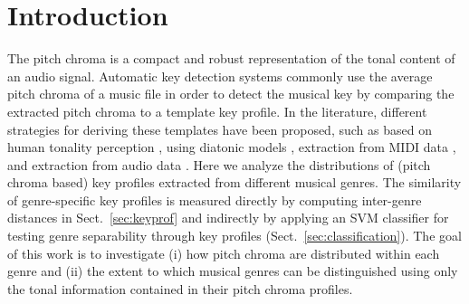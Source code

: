 \documentclass{article}
\title{\papertitle}
\begin{document}
%
\capstartfalse
\maketitle
\capstarttrue
%
\begin{abstract}
The most common approaches to the automatic recognition
of musical key are template-based, i.e., an extracted pitch
chroma vector is compared to a template key profile in order
to identify the most similar key. General as well as domain-specific templates have been used in the past, but to the authors’ best knowledge there has been no study that evaluated
genre-specific key profiles extracted from the audio signal. We
investigate the pitch chroma distributions for 9 different genres, their distances, and the degree to which these genres can
be identified using these distributions when utilizing different
strategies for achieving key-invariance.
\end{abstract}
%

\section{Introduction}\label{sec:introduction}
The pitch chroma is a compact and robust representation of
the tonal content of an audio signal. Automatic key detection
systems commonly use the average pitch chroma of a music
file in order to detect the musical key by comparing the extracted pitch chroma to a template key profile. In the literature,
different strategies for deriving these templates have been proposed, such as based on human tonality perception \cite{krumhansl_cognitive_1990}, using
diatonic models \cite{izmirli_template_2005}, extraction from MIDI data \cite{temperley_pitch-class_2008}, and extraction from audio data \cite{van_de_par_musical_2006}. Here we analyze the distributions
of (pitch chroma based) key profiles extracted from different
musical genres. The similarity of genre-specific key profiles
is measured directly by computing inter-genre distances in
Sect.~\ref{sec:keyprof} and indirectly by applying an SVM classifier for testing genre separability through key profiles (Sect.~\ref{sec:classification}). The goal
of this work is to investigate (i) how pitch chroma are distributed within each genre and (ii) the extent to which musical
genres can be distinguished using only the tonal information
contained in their pitch chroma profiles.
\end{document}
